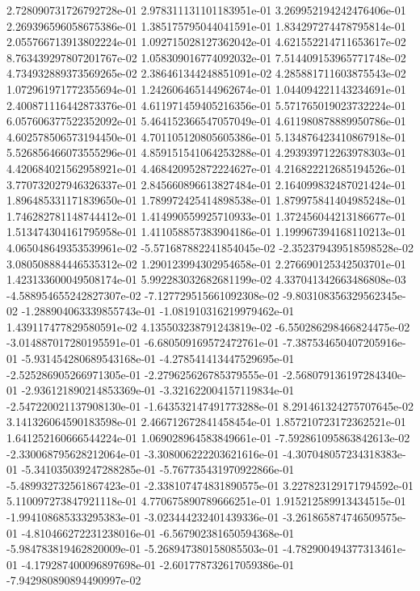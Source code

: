 2.728090731726792728e-01
2.978311131101183951e-01
3.269952194242476406e-01
2.269396596058675386e-01
1.385175795044041591e-01
1.834297274478795814e-01
2.055766713913802224e-01
1.092715028127362042e-01
4.621552214711653617e-02
8.763439297807201767e-02
1.058309016774092032e-01
7.514409153965771748e-02
4.734932889373569265e-02
2.386461344248851091e-02
4.285881711603875543e-02
1.072961971772355694e-01
1.242606465144962674e-01
1.044094221143234691e-01
2.400871116442873376e-01
4.611971459405216356e-01
5.571765019023732224e-01
6.057606377522352092e-01
5.464152366547057049e-01
4.611980878889950786e-01
4.602578506573194450e-01
4.701105120805605386e-01
5.134876423410867918e-01
5.526856466073555296e-01
4.859151541064253288e-01
4.293939712263978303e-01
4.420684021562958921e-01
4.468420952872224627e-01
4.216822212685194526e-01
3.770732027946326337e-01
2.845660896613827484e-01
2.164099832487021424e-01
1.896485331171839650e-01
1.789972425414898538e-01
1.879975841404985248e-01
1.746282781148744412e-01
1.414990559925710933e-01
1.372456044213186677e-01
1.513474304161795958e-01
1.411058857383904186e-01
1.199967394168110213e-01
4.065048649353539961e-02
-5.571687882241854045e-02
-2.352379439518598528e-02
3.080508884446535312e-02
1.290123994302954658e-01
2.276690125342503701e-01
1.423133600049508174e-01
5.992283032682681199e-02
4.337041342663486808e-03
-4.588954655242827307e-02
-7.127729515661092308e-02
-9.803108356329562345e-02
-1.288904063339855743e-01
-1.081910316219979462e-01
1.439117477829580591e-02
4.135503238791243819e-02
-6.550286298466824475e-02
-3.014887017280195591e-01
-6.680509169572472761e-01
-7.387534650407205916e-01
-5.931454280689543168e-01
-4.278541413447529695e-01
-2.525286905266971305e-01
-2.279625626785379555e-01
-2.568079136197284340e-01
-2.936121890214853369e-01
-3.321622004157119834e-01
-2.547220021137908130e-01
-1.643532147491773288e-01
8.291461324275707645e-02
3.141326064590183598e-01
2.466712672841458454e-01
1.857210723172362521e-01
1.641252160666544224e-01
1.069028964583849661e-01
-7.592861095863842613e-02
-2.330068795628212064e-01
-3.308006222203621616e-01
-4.307048057234318383e-01
-5.341035039247288285e-01
-5.767735431970922866e-01
-5.489932732561867423e-01
-2.338107474831890575e-01
3.227823129171794592e-01
5.110097273847921118e-01
4.770675890789666251e-01
1.915212589913434515e-01
-1.994108685333295383e-01
-3.023444232401439336e-01
-3.261865874746509575e-01
-4.810466272231238016e-01
-6.567902381650594368e-01
-5.984783819462820009e-01
-5.268947380158085503e-01
-4.782900494377313461e-01
-4.179287400096897698e-01
-2.601778732617059386e-01
-7.942980890894490997e-02
